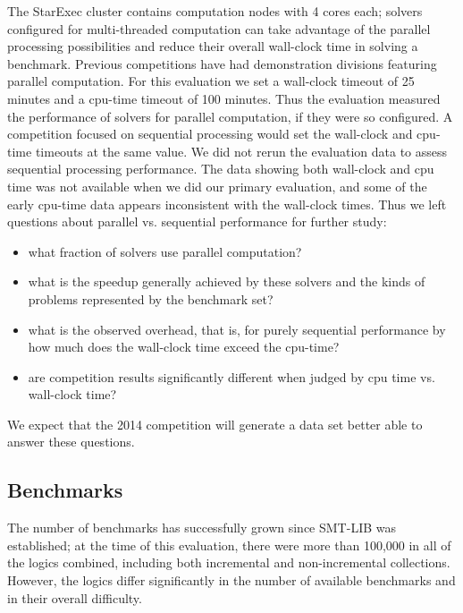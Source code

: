 \documentclass{eptcs}
\begin{document}
The StarExec cluster contains computation nodes with 4 cores each; solvers configured for multi-threaded computation can take advantage of the parallel processing possibilities and reduce their overall wall-clock time in solving a benchmark. Previous competitions have had demonstration divisions featuring parallel computation.
For this evaluation we set a wall-clock timeout of 25 minutes and a cpu-time timeout of 100 minutes. Thus the evaluation measured the performance of solvers for parallel computation, if they were so configured. A competition focused on sequential processing would set the wall-clock and cpu-time timeouts at the same value.
We did not rerun the evaluation data to assess sequential processing performance. The data showing both wall-clock and cpu time was not available when we did our 
primary evaluation, and some of the early cpu-time data appears inconsistent with the wall-clock times. Thus we left questions about parallel vs. sequential performance for further study: 
\begin{itemize}
\item what fraction of solvers use parallel computation?
\item what is the speedup generally achieved by these solvers and the kinds of problems represented by the benchmark set?
\item what is the observed overhead, that is, for purely sequential performance by how much does the wall-clock time exceed the cpu-time?
\item are competition results significantly different when judged by cpu time vs. wall-clock time?
\end{itemize}
We expect that the 2014 competition will generate a data set better able to answer these questions.

\subsection{Benchmarks}
\label{Benchmarks}

The number of benchmarks has successfully grown since SMT-LIB was established; at the time of this evaluation, there were more than 100,000 in all of the logics combined, including both incremental and non-incremental collections. However, the logics differ significantly in the number of available benchmarks and in their overall difficulty.
\end{document}

